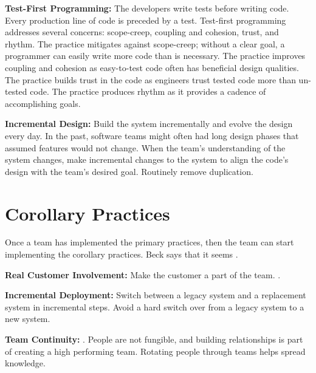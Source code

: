 \textbf{Test-First Programming:} The developers write tests before writing code. Every production line of code is preceded by a test.  Test-first programming addresses several concerns: scope-creep,  coupling and cohesion, trust, and rhythm. The practice mitigates against scope-creep; without a clear goal, a programmer can easily write more code than is necessary. The practice improves coupling and cohesion as easy-to-test code often has beneficial design qualities. The practice builds trust in the code as engineers trust tested code more than un-tested code. The practice produces rhythm as it provides a cadence of accomplishing goals.

\textbf{Incremental Design:} Build the system incrementally and evolve the design every day. In the past, software teams might often had long design phases that assumed features would not change. When the team's understanding of the system changes, make incremental changes to the system to align the code's design with the team's desired goal. Routinely remove duplication.

\section{Corollary Practices}
Once a team has implemented the primary practices, then the team can start implementing the corollary practices. Beck says that it seems  \cite{BeckExtremeProgramming2004}.

\textbf{Real Customer Involvement:} Make the customer a part of the team.   \cite{BeckExtremeProgramming2004}.


\textbf{Incremental Deployment:} Switch between a legacy system and a replacement system in incremental steps. Avoid a hard switch over from a legacy system to a new system.


\textbf{Team Continuity:}   \cite{BeckExtremeProgramming2004}. People are not fungible, and building relationships is part of creating a high performing team. Rotating people through teams helps spread knowledge.

